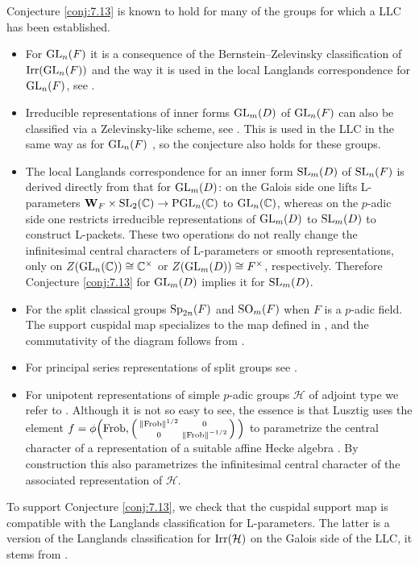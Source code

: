 \documentclass[11pt]{amsart}
\theoremstyle{definition}
\providecommand{\norm}[1]{\left\| #1 \right\|}
\newcommand{\mb}{\mathbf}
\newcommand{\C}{\mathbb C}
\newcommand{\matje}[4]{\left(\begin{smallmatrix} #1 & #2 \\ 
#3 & #4 \end{smallmatrix}\right)}
\def\Irr{{\rm Irr}}
\def\SO{{\rm SO}}
\def\Sp{{\rm Sp}}
\def\GL{{\rm GL}}
\def\PGL{{\rm PGL}}
\def\SL{{\rm SL}}
\def\cH{{\mathcal H}}
\def\Fr{{\rm Frob}}
\begin{document}
Conjecture \ref{conj:7.13} is known to hold for many of the groups for which a LLC
has been established.
\begin{itemize}
\item For $\GL_n (F)$ it is a consequence of the Bernstein--Zelevinsky
classification of $\Irr (\GL_n (F))$ \cite{Zel} and the way it is used in the local
Langlands correspondence for $\GL_n (F)$, see \cite[\S 2]{Hen}.
\item Irreducible representations of inner forms $\GL_m (D)$ of $\GL_n (F)$ can 
also be classified via a Zelevinsky-like scheme, see \cite{Tad}. This is used in
the LLC in the same way as for $\GL_n (F)$ \cite[\S 2]{ABPS3}, so the conjecture
also holds for these groups.
\item The local Langlands correspondence for an inner form $\SL_m (D)$ of $\SL_n (F)$
is derived directly from that for $\GL_m (D)$: on the Galois side one lifts 
L-parameters $\mb W_F \times \SL_2 (\C) \to \PGL_n (\C)$ to $\GL_n (\C)$,
whereas on the $p$-adic side one restricts irreducible representations of
$\GL_m (D)$ to $\SL_m (D)$ to construct L-packets.
These two operations do not really change the infinitesimal central characters
of L-parameters or smooth representations, only on $Z(\GL_n (\C)) \cong \C^\times$ 
or $Z(\GL_m (D)) \cong F^\times$, respectively. Therefore Conjecture 
\ref{conj:7.13} for $\GL_m (D)$ implies it for $\SL_m (D)$.
\item For the split classical groups $\Sp_{2n}(F)$ and $\SO_{m}(F)$ when $F$ is a 
$p$-adic field. The support cuspidal map specializes to the map defined in 
\cite[Th\'eor\`eme~4.27]{Mou}, and the commutativity of the diagram follows from 
\cite[Th\'eor\`eme~5.9]{Mou}. 
\item For principal series representations of split groups see 
\cite[Theorem 15.1]{ABPS5}.
\item For unipotent representations of simple $p$-adic groups $\cH$ of adjoint 
type we refer to \cite{Lus3}. Although it is not so easy to see, the essence is 
that Lusztig uses the element 
$f = \phi \Big( \Fr, \matje{\norm{\Fr}^{1/2}}{0}{0}{\norm{\Fr}^{-1/2}} \Big)$
to parametrize the central character of a representation of a suitable
affine Hecke algebra \cite[\S 9.3]{Lus3}. By construction this also 
parametrizes the infinitesimal central character of the associated 
representation of $\cH$.
\end{itemize}

To support Conjecture \ref{conj:7.13}, we check that the cuspidal support map
is compatible with the Langlands classification for L-parameters. The latter
is a version of the Langlands classification for $\Irr (\cH)$ on the Galois
side of the LLC, it stems from \cite{SiZi}.
\end{document}
